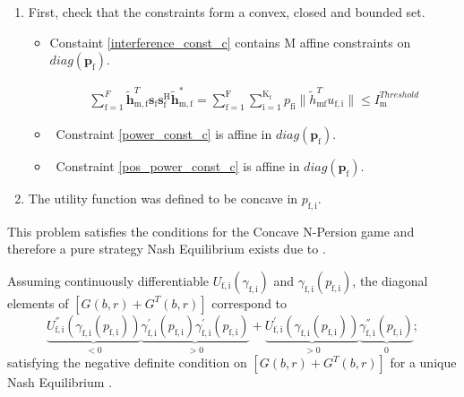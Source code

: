 \documentclass[12pt,a4paper]{report}
\begin{document}
\begin{enumerate}


\item
First, check that the constraints form a convex, closed and bounded set. 

\begin{itemize}

\item
	Constaint \eqref{interference_const_c} contains $\text{M}$ affine constraints on $diag(\mathbf{p_{\mathrm{f}}})$.

\begin{gather*}
	  \sum^F_{\text{f}=1} \mathbf{\tilde{h}}_{\mathrm{m,f}}^T  \mathbf{s}_{\mathrm{f}} 						
	\mathbf{s_{\mathrm{f}}^{\mathrm{H}}} \mathbf{\tilde{h}_{\mathrm{m,f}}^*} 
	=
	\sum_{\mathrm{f=1}}^{\mathrm{F}}	\sum_{\mathrm{i=1}}^{\mathrm{K_f}}
	p_{\mathrm{fi}}\|\tilde{h}_{\mathrm{mf}}^T u_{\mathrm{f,i}}\|
	\leq I^{Threshold}_{\mathrm{m}} 
\end{gather*}

\item \
	Constraint \eqref{power_const_c} is  affine in $diag(\mathbf{p_{\mathrm{f}}})$.
	
\item \
	Constraint \eqref{pos_power_const_c} is affine in $diag(\mathbf{p_{\mathrm{f}}})$.
\end{itemize}


\item The utility function was defined to be concave in $p_{\mathrm{f,i}}$. 

\end{enumerate}

This problem satisfies the conditions for the Concave N-Persion game and therefore a pure strategy Nash Equilibrium exists due to 
\cite[Thm1]{rosen1964existence}.

Assuming continuously differentiable $U_{\mathrm{f,i}}(\gamma_{\mathrm{f,i}})$ and $\gamma_{\mathrm{f,i}}(p_{\mathrm{f,i}})$, the diagonal elements of $[G(b,r)+G^{T}(b,r)] $ correspond to
\begin{equation}
\underbrace{U^{''}_{\mathrm{f,i}}(\gamma_{\mathrm{f,i}}(p_{\mathrm{f,i}}))}_{<0}\underbrace{\gamma^{'}_{\mathrm{f,i}}(p_{\mathrm{f,i}})\gamma^{'}_{\mathrm{f,i}}(p_{\mathrm{f,i}})}_{>0}
+
\underbrace{U^{'}_{\mathrm{f,i}}(\gamma_{\mathrm{f,i}}(p_{\mathrm{f,i}}))}_{>0}\underbrace{\gamma^{''}_{\mathrm{f,i}}(p_{\mathrm{f,i}})}_{0};
\end{equation}
satisfying the  negative definite condition on $[G(b,r)+G^{T}(b,r)] $ for a unique Nash Equilibrium \cite[Thm4]{rosen1964existence}.
\end{document}
